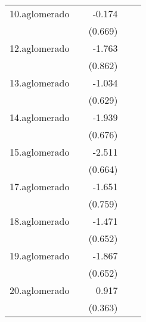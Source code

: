 {\begin{longtable}{l*{4}{D{.}{.}{-1}}}
\addlinespace
10.aglomerado&                     &      -0.174         &                     &                     \\
            &                     &     (0.669)         &                     &                     \\
\addlinespace
12.aglomerado&                     &      -1.763\sym{*}  &                     &                     \\
            &                     &     (0.862)         &                     &                     \\
\addlinespace
13.aglomerado&                     &      -1.034         &                     &                     \\
            &                     &     (0.629)         &                     &                     \\
\addlinespace
14.aglomerado&                     &      -1.939\sym{**} &                     &                     \\
            &                     &     (0.676)         &                     &                     \\
\addlinespace
15.aglomerado&                     &      -2.511\sym{***}&                     &                     \\
            &                     &     (0.664)         &                     &                     \\
\addlinespace
17.aglomerado&                     &      -1.651\sym{*}  &                     &                     \\
            &                     &     (0.759)         &                     &                     \\
\addlinespace
18.aglomerado&                     &      -1.471\sym{*}  &                     &                     \\
            &                     &     (0.652)         &                     &                     \\
\addlinespace
19.aglomerado&                     &      -1.867\sym{**} &                     &                     \\
            &                     &     (0.652)         &                     &                     \\
\addlinespace
20.aglomerado&                     &       0.917\sym{*}  &                     &                     \\
            &                     &     (0.363)         &                     &                     \\

\end{longtable}}
